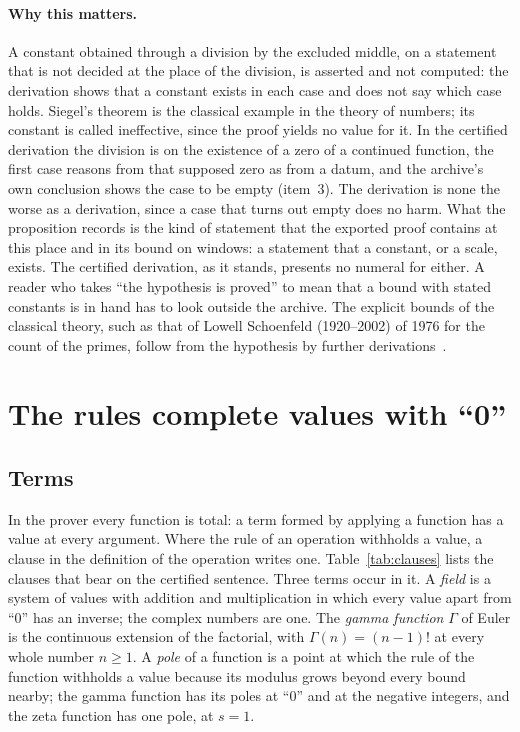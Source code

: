 \documentclass[11pt]{article}
\theoremstyle{definition}
\theoremstyle{remark}
\begin{document}
\paragraph{Why this matters.} A constant obtained through a division by the excluded middle, on a statement that is not decided at the place of the division, is asserted and not computed: the derivation shows that a constant exists in each case and does not say which case holds. Siegel's theorem is the classical example in the theory of numbers; its constant is called ineffective, since the proof yields no value for it. In the certified derivation the division is on the existence of a zero of a continued function, the first case reasons from that supposed zero as from a datum, and the archive's own conclusion shows the case to be empty (item~3). The derivation is none the worse as a derivation, since a case that turns out empty does no harm. What the proposition records is the kind of statement that the exported proof contains at this place and in its bound on windows: a statement that a constant, or a scale, exists. The certified derivation, as it stands, presents no numeral for either. A reader who takes ``the hypothesis is proved'' to mean that a bound with stated constants is in hand has to look outside the archive. The explicit bounds of the classical theory, such as that of Lowell Schoenfeld (1920--2002) of 1976 for the count of the primes, follow from the hypothesis by further derivations~\citep{schoenfeld76}.


\section{The rules complete values with ``0''}\label{sec:values}

\subsection{Terms}

In the prover every function is total: a term formed by applying a function has a value at every argument. Where the rule of an operation withholds a value, a clause in the definition of the operation writes one. Table~\ref{tab:clauses} lists the clauses that bear on the certified sentence. Three terms occur in it. A \emph{field} is a system of values with addition and multiplication in which every value apart from ``0'' has an inverse; the complex numbers are one. The \emph{gamma function} $\Gamma$ of Euler is the continuous extension of the factorial, with $\Gamma(n)=(n-1)!$ at every whole number $n\ge1$. A \emph{pole} of a function is a point at which the rule of the function withholds a value because its modulus grows beyond every bound nearby; the gamma function has its poles at ``0'' and at the negative integers, and the zeta function has one pole, at $s=1$.
\end{document}

